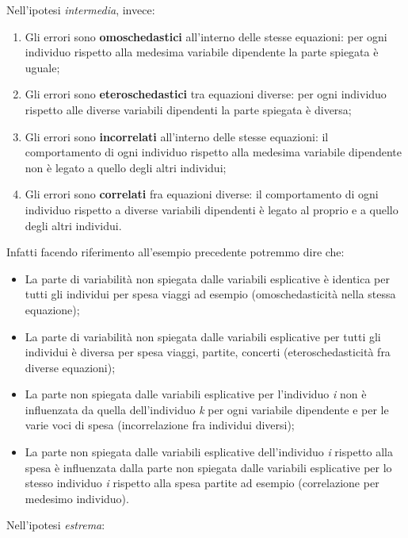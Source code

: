 \documentclass[a4page, 11pt]{article} %
\begin{document}
Nell’ipotesi \emph{intermedia}, invece:
\begin{enumerate}[noitemsep]

\item Gli errori sono \textbf{omoschedastici} all’interno delle stesse equazioni: per ogni individuo rispetto alla medesima variabile dipendente la parte spiegata è uguale;
\item Gli errori sono \textbf{eteroschedastici} tra equazioni diverse: per ogni individuo rispetto alle diverse variabili dipendenti la parte spiegata è diversa;
\item Gli errori sono \textbf{incorrelati} all’interno delle stesse equazioni: il comportamento di ogni individuo rispetto alla medesima variabile dipendente non è legato a quello degli altri individui;
\item Gli errori sono \textbf{correlati} fra equazioni diverse: il comportamento di ogni individuo rispetto a diverse variabili dipendenti è legato al proprio e a quello degli altri individui.
\end{enumerate}
Infatti facendo riferimento all'esempio precedente potremmo dire che:
\begin{itemize}[noitemsep]
\item La parte di variabilità non spiegata dalle variabili esplicative è identica per tutti gli individui per spesa viaggi ad esempio (omoschedasticità nella stessa equazione);
\item La parte di variabilità non spiegata dalle variabili esplicative per tutti gli individui è diversa  per spesa viaggi, partite, concerti (eteroschedasticità fra diverse equazioni);
\item La parte non spiegata dalle variabili esplicative per l’individuo \textit{i} non è influenzata da quella dell'individuo \textit{k} per ogni variabile dipendente e per le varie voci di spesa (incorrelazione fra individui diversi);
\item La parte non spiegata dalle variabili esplicative dell’individuo \textit{i} rispetto alla spesa  è influenzata dalla parte non spiegata dalle variabili esplicative per lo stesso individuo \textit{i} rispetto alla spesa partite ad esempio (correlazione per medesimo individuo).
\end{itemize}
Nell’ipotesi \emph{estrema}:
\end{document}
